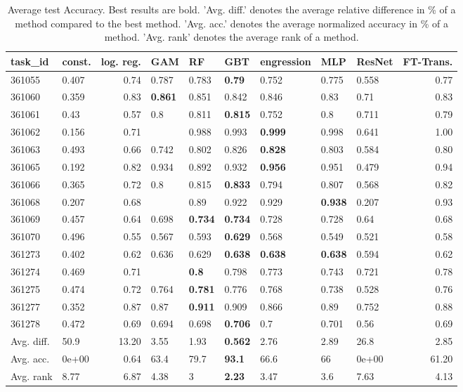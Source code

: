 \begin{table}[ht!]
\centering
\begingroup\footnotesize
\begin{tabular}{llrllllllr}
  \hline
\hline
task\_id & const. & log. reg. & GAM & RF & GBT & engression & MLP & ResNet & FT-Trans. \\ 
  \hline
361055 & 0.407 & 0.74 & 0.787 & 0.783 & \textbf{0.79} & 0.752 & 0.775 & 0.558 & 0.77 \\ 
  361060 & 0.359 & 0.83 & \textbf{0.861} & 0.851 & 0.842 & 0.846 & 0.83 & 0.71 & 0.83 \\ 
  361061 & 0.43 & 0.57 & 0.8 & 0.811 & \textbf{0.815} & 0.752 & 0.8 & 0.711 & 0.79 \\ 
  361062 & 0.156 & 0.71 &  & 0.988 & 0.993 & \textbf{0.999} & 0.998 & 0.641 & 1.00 \\ 
  361063 & 0.493 & 0.66 & 0.742 & 0.802 & 0.826 & \textbf{0.828} & 0.803 & 0.584 & 0.80 \\ 
  361065 & 0.192 & 0.82 & 0.934 & 0.892 & 0.932 & \textbf{0.956} & 0.951 & 0.479 & 0.94 \\ 
  361066 & 0.365 & 0.72 & 0.8 & 0.815 & \textbf{0.833} & 0.794 & 0.807 & 0.568 & 0.82 \\ 
  361068 & 0.207 & 0.68 &  & 0.89 & 0.922 & 0.929 & \textbf{0.938} & 0.207 & 0.93 \\ 
  361069 & 0.457 & 0.64 & 0.698 & \textbf{0.734} & \textbf{0.734} & 0.728 & 0.728 & 0.64 & 0.68 \\ 
  361070 & 0.496 & 0.55 & 0.567 & 0.593 & \textbf{0.629} & 0.568 & 0.549 & 0.521 & 0.58 \\ 
  361273 & 0.402 & 0.62 & 0.636 & 0.629 & \textbf{0.638} & \textbf{0.638} & \textbf{0.638} & 0.594 & 0.62 \\ 
  361274 & 0.469 & 0.71 &  & \textbf{0.8} & 0.798 & 0.773 & 0.743 & 0.721 & 0.78 \\ 
  361275 & 0.474 & 0.72 & 0.764 & \textbf{0.781} & 0.776 & 0.768 & 0.738 & 0.528 & 0.76 \\ 
  361277 & 0.352 & 0.87 & 0.87 & \textbf{0.911} & 0.909 & 0.866 & 0.89 & 0.752 & 0.88 \\ 
  361278 & 0.472 & 0.69 & 0.694 & 0.698 & \textbf{0.706} & 0.7 & 0.701 & 0.56 & 0.69 \\ 
   \hline
Avg. diff. & 50.9 & 13.20 & 3.55 & 1.93 & \textbf{0.562} & 2.76 & 2.89 & 26.8 & 2.85 \\ 
  Avg. acc. & 0e+00 & 0.64 & 63.4 & 79.7 & \textbf{93.1} & 66.6 & 66 & 0e+00 & 61.20 \\ 
  Avg. rank & 8.77 & 6.87 & 4.38 & 3 & \textbf{2.23} & 3.47 & 3.6 & 7.63 & 4.13 \\ 
   \hline
\hline
\end{tabular}
\endgroup
\caption{Average test Accuracy. 
                  Best results are bold. 
                  'Avg. diff.' denotes the average relative difference in \% of a method compared to the best method.
                  'Avg. acc.' denotes the average normalized accuracy in \% of a method.
                  'Avg. rank' denotes the average rank of a method.} 
\label{TABLES/table_results_Accuracy_clustering}
\end{table}
